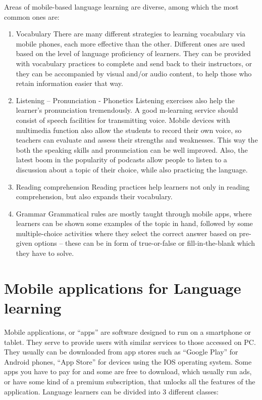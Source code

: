 \documentclass[10pt,english,a4paper]{article}
\begin{document}
Areas of mobile-based language learning are diverse, among which the most common ones are: 

\begin{enumerate}

\item Vocabulary \newline
There are many different strategies to learning vocabulary via mobile phones, each more effective than the other. Different ones are used based on the level of language proficiency of learners. They can be provided with vocabulary practices to complete and send back to their instructors, or they can be accompanied by visual and/or audio content, to help those who retain information easier that way.

\item Listening – Pronunciation - Phonetics \newline
Listening exercises also help the learner’s pronunciation tremendously. A good m-learning service should consist of speech facilities for transmitting voice. Mobile devices with multimedia function also allow the students to record their own voice, so teachers can evaluate and assess their strengths and weaknesses. This way the both the speaking skills and pronunciation can be well improved.
Also, the latest boom in the popularity of podcasts allow people to listen to a discussion about  a topic of their choice, while also practicing the language.

\item Reading comprehension \newline
Reading practices help learners not only in reading comprehension, but also expands their vocabulary. 

\item Grammar \newline
Grammatical rules are mostly taught through mobile apps, where learners can be shown some examples of the topic in hand, followed by some multiple-choice activities where they select the correct answer based on pre-given options – these can be in form of true-or-false or fill-in-the-blank which they have to solve.

\end{enumerate}


\section{Mobile applications for Language learning} 
Mobile applications, or “apps” are software designed to run on a smartphone or tablet. They serve to provide users with similar services to those accessed on PC. They usually can be downloaded from app stores such as “Google Play” for Android phones, “App Store” for devices using the IOS operating system. Some apps you have to pay for and some are free to download, which usually run ads, or have some kind of a premium subscription, that unlocks all the features of the application. \newline
Language learners can be divided into 3 different classes:
\end{document}
